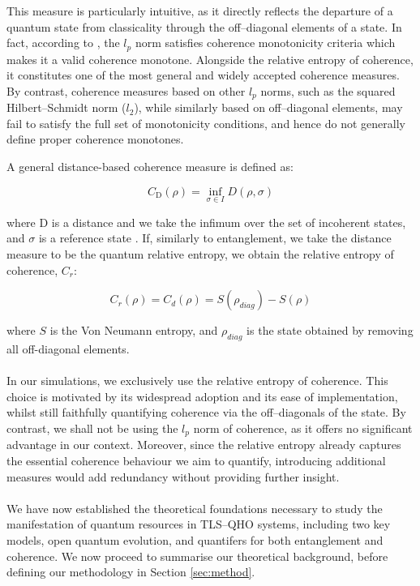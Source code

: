 \documentclass[11pt]{article}
\newcounter{subsubsubsection}[subsubsection]
\begin{document}
This measure is particularly intuitive, as it directly reflects the departure of a quantum state from classicality through the off--diagonal elements of a state. In fact, according to \cite{Coherence2014-seed}, the $l_p$ norm satisfies coherence monotonicity criteria which makes it a valid coherence monotone. Alongside the relative entropy of coherence, it constitutes one of the most general and widely accepted coherence measures. By contrast, coherence measures based on other $l_p$ norms, such as the squared Hilbert–Schmidt norm ($l_2$), while similarly based on off--diagonal elements, may fail to satisfy the full set of monotonicity conditions, and hence do not generally define proper coherence monotones.


A general distance-based coherence measure is defined as:

\begin{equation}
    C_{\scriptscriptstyle\text{D}}(\rho) = \inf_{\sigma \in I} D(\rho,\sigma)
\end{equation}

where D is a distance and we take the infimum over the set of incoherent states, and $\sigma$ is a reference state \cite{Coherence2017-Colloquium}. If, similarly to entanglement, we take the distance measure to be the quantum relative entropy, we obtain the relative entropy of coherence, $C_r$:

\begin{equation} \label{rel_ent_coh}
C_r(\rho) = C_d(\rho) = S(\rho_{diag}) - S(\rho)
\end{equation}

where $S$ is the Von Neumann entropy, and $\rho_{diag}$ is the state obtained by removing all off-diagonal elements. \\
\\
In our simulations, we exclusively use the relative entropy of coherence. This choice is motivated by its widespread adoption and its ease of implementation, whilst still faithfully quantifying coherence via the off--diagonals of the state. By contrast, we shall not be using the $l_p$ norm of coherence, as it offers no significant advantage in our context. Moreover, since the relative entropy already captures the essential coherence behaviour we aim to quantify, introducing additional measures would add redundancy without providing further insight.\\
\\
We have now established the theoretical foundations necessary to study the manifestation of quantum resources in TLS--QHO systems, including two key models, open quantum evolution, and quantifers for both entanglement and coherence. We now proceed to summarise our theoretical background, before defining our methodology in Section \ref{sec:method}.
\end{document}
